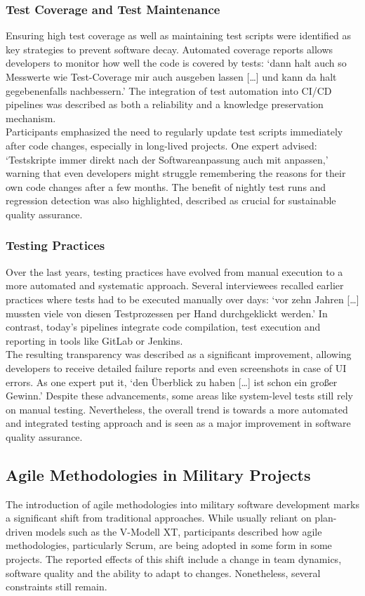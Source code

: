 \subsubsection{Test Coverage and Test Maintenance}
Ensuring high test coverage as well as maintaining test scripts were identified as key strategies to prevent software decay. Automated coverage reports allows developers to monitor how well the code is covered by tests: `dann halt auch so Messwerte wie Test-Coverage mir auch ausgeben lassen [\ldots] und kann da halt gegebenenfalls nachbessern.'
The integration of test automation into CI/CD pipelines was described as both a reliability and a knowledge preservation mechanism.\\
Participants emphasized the need to regularly update test scripts immediately after code changes, especially in long-lived projects. One expert advised: `Testskripte immer direkt nach der Softwareanpassung auch mit anpassen,' warning that even developers might struggle remembering the reasons for their own code changes after a few months.
The benefit of nightly test runs and regression detection was also highlighted, described as crucial for sustainable quality assurance.\\

\subsubsection{Testing Practices}
Over the last years, testing practices have evolved from manual execution to a more automated and systematic approach. Several interviewees recalled earlier practices where tests had to be executed manually over days: `vor zehn Jahren [\ldots] mussten viele von diesen Testprozessen per Hand durchgeklickt werden.' In contrast, today's pipelines
integrate code compilation, test execution and reporting in tools like GitLab or Jenkins.\\
The resulting transparency was described as a significant improvement, allowing developers to receive detailed failure reports and even screenshots in case of \ac{UI} errors. As one expert put it, `den Überblick zu haben [\ldots] ist schon ein großer Gewinn.'
Despite these advancements, some areas like system-level tests still rely on manual testing. Nevertheless, the overall trend is towards a more automated and integrated testing approach and is seen as a major improvement in software quality assurance.\\

\subsection{Agile Methodologies in Military Projects}
The introduction of agile methodologies into military software development marks a significant shift from traditional approaches. While usually reliant on plan-driven models such as the V-Modell XT, participants described how agile methodologies, particularly Scrum, are being adopted in some form in some projects.
The reported effects of this shift include a change in team dynamics, software quality and the ability to adapt to changes. Nonetheless, several constraints still remain.

